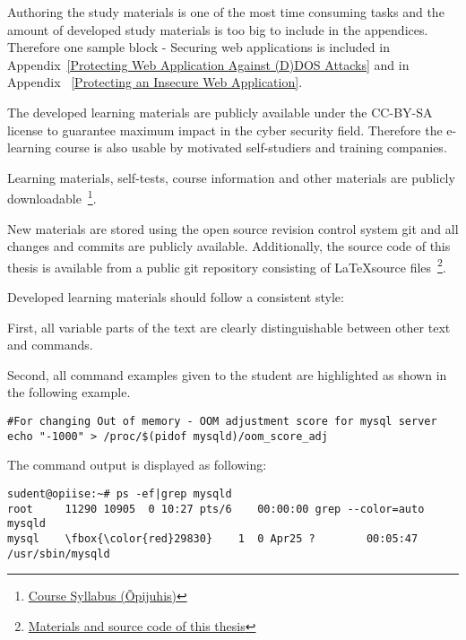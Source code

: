 Authoring the study materials is one of the most time consuming tasks and the amount of developed study materials is too big to include in the appendices. Therefore one sample block - Securing web applications is included in Appendix~\ref{Protecting Web Application Against (D)DOS Attacks} and in Appendix~ \ref{Protecting an Insecure Web Application}. 

The developed learning materials are publicly available  under the \gls{CC-BY-SA} license to guarantee maximum impact in the cyber security field. Therefore the e-learning course is also usable by motivated self-studiers and training companies. 

Learning materials, self-tests, course information and other materials are publicly downloadable~\footnote{\href{http://elab.itcollege.ee:8000/cyber-course/}{Course Syllabus (Õpijuhis)}}.


New materials are stored using the open source revision control system \gls{git} and all changes and commits are publicly available. Additionally, the source code of this thesis is available from a public \gls{git} repository consisting of \LaTeX  source files~\footnote{\href{https://github.com/magavdraakon/margus-thesis.git}{Materials and source code of this thesis}}.


Developed learning materials should follow a consistent style:

First, all variable parts of the text are clearly distinguishable between other text and commands.



Second, all command examples given to the student are highlighted as shown in the following example.

\begin{verbatim}
#For changing Out of memory - OOM adjustment score for mysql server
echo "-1000" > /proc/$(pidof mysqld)/oom_score_adj
\end{verbatim}


The command output is displayed as following:
\small{
\begin{Verbatim}[samepage=true,frame=single,
label=Command output,framesep=2mm,rulecolor=\color{red},commandchars=\\\{\}]
sudent@opiise:~# ps -ef|grep mysqld
root     11290 10905  0 10:27 pts/6    00:00:00 grep --color=auto mysqld
mysql    \fbox{\color{red}29830}    1  0 Apr25 ?        00:05:47 /usr/sbin/mysqld
\end{Verbatim}
%
}

